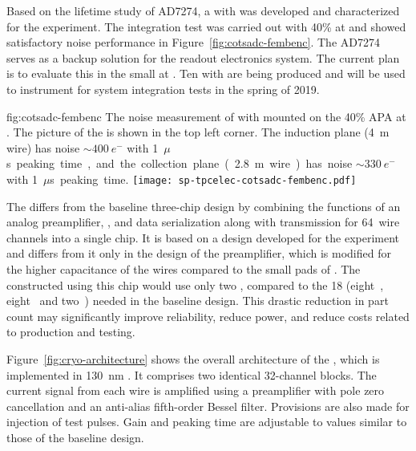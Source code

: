 Based on the lifetime study of AD7274, a  with  
 was developed and characterized for the  experiment. The 
integration test was carried out with 40\%  at  and 
showed satisfactory noise performance in Figure~\ref{fig:cotsadc-fembenc}. 
The   AD7274 serves as a backup solution for the 
   readout electronics system. The current 
plan is to evaluate this  in the small  
 at . Ten  with  
 are being produced and will be used to instrument  
 for system integration tests in the spring of 2019. 

\begin{dunefigure}
{fig:cotsadc-fembenc}
{The noise measurement of  with   
mounted on the \num{40}\% APA at . The picture of the 
 is shown in the top left corner. The induction plane 
(\SI{4}{m} wire) has noise $\sim\SI{400}{e^-}$ with \SI{1}{$\mu$s} 
peaking time, and the collection plane (\SI{2.8}{m} wire) has noise 
$\sim\SI{330}{e^-}$ with \SI{1}{$\mu$s} peaking time.}
\texttt{[image: sp-tpcelec-cotsadc-fembenc.pdf]}
\end{dunefigure}


\label{sec:fdsp-tpcelec-design-femb-alt-cryo}

The    differs from the baseline 
three-chip design by combining the functions of an analog 
preamplifier, , and data serialization along with %
transmission 
for \num{64}~wire channels into a single chip. It is based on a design 
developed for the  experiment~\cite{nEXO} and differs from 
it only in the design of the preamplifier, which is modified for the 
higher capacitance of the   wires compared 
to the small pads of . The  constructed using 
this chip would use only two , compared to the \num{18} 
(eight~, eight~ and two~) needed 
in the baseline design. This drastic reduction in part count may 
significantly improve  reliability, reduce power, and reduce 
costs related to production and testing. 

Figure~\ref{fig:cryo-architecture} shows the overall architecture of 
the  , which is implemented in 
\SI{130}{nm} . It comprises two identical \num{32}-channel 
blocks. The current signal from each wire is amplified using a preamplifier 
with pole zero cancellation and an anti-alias fifth-order Bessel filter. 
Provisions are also made for injection of test pulses. Gain and peaking 
time are adjustable to values similar to those of the baseline design.

